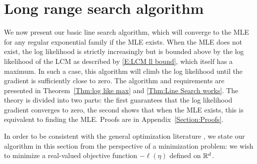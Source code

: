 \section{Long range search algorithm} \label{S:Algorithm}
We now present our basic line search algorithm, which will converge to the MLE for any 
regular exponential family if the MLE exists.  When the MLE does not exist, the log
likelihood is strictly increasingly but is bounded above by the log likelihood of the LCM
as described by \eqref{E:LCM ll bound}, which itself has a maximum.  In such a case,
this algorithm will climb the log likelihood until the gradient is sufficiently close to zero.
The algorithm and requirements are presented in Theorem~\ref{Thm:log like max} and \ref{Thm:Line Search works}.  The theory is divided into two parts: the first
guarantees that the log likelihood gradient converges to zero, the second shows that when the MLE exists, this is equivalent to finding the MLE.  Proofs are in Appendix~\ref{Section:Proofs}. 

In order to be consistent with the general optimization literature \citep{Fletcher,NW}, 
we state our algorithm in this 
section from the perspective of a minimization problem: we wish to minimize a 
real-valued objective function $-\ell(\eta)$ 
defined on ${\mathbb R}^d$.  

